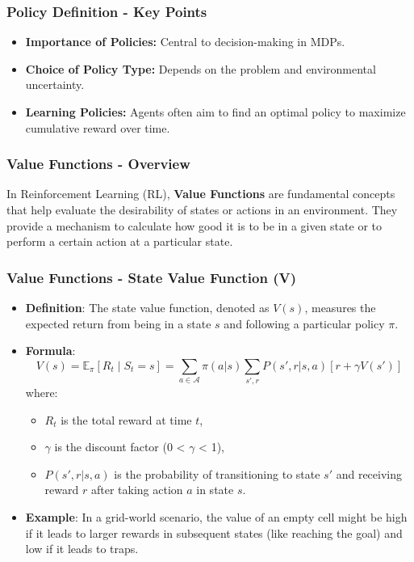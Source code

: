 \documentclass[aspectratio=169]{beamer}
\begin{document}
\begin{frame}[fragile]
    \frametitle{Policy Definition - Key Points}
    \begin{itemize}
        \item \textbf{Importance of Policies:} Central to decision-making in MDPs.
        \item \textbf{Choice of Policy Type:} Depends on the problem and environmental uncertainty.
        \item \textbf{Learning Policies:} Agents often aim to find an optimal policy to maximize cumulative reward over time.
    \end{itemize}
\end{frame}

\begin{frame}[fragile]
    \frametitle{Value Functions - Overview}
    In Reinforcement Learning (RL), \textbf{Value Functions} are fundamental concepts that help evaluate the desirability of states or actions in an environment. They provide a mechanism to calculate how good it is to be in a given state or to perform a certain action at a particular state.
\end{frame}

\begin{frame}[fragile]
    \frametitle{Value Functions - State Value Function (V)}
    \begin{itemize}
        \item \textbf{Definition}: The state value function, denoted as \( V(s) \), measures the expected return from being in a state \( s \) and following a particular policy \( \pi \).
        
        \item \textbf{Formula}:
        \begin{equation}
            V(s) = \mathbb{E}_\pi \left[ R_t \mid S_t = s \right] = \sum_{a \in \mathcal{A}} \pi(a|s) \sum_{s', r} P(s', r | s, a) [r + \gamma V(s')]
        \end{equation}
        where:
        \begin{itemize}
            \item \( R_t \) is the total reward at time \( t \),
            \item \( \gamma \) is the discount factor (0 < \(\gamma\) < 1),
            \item \( P(s', r | s, a) \) is the probability of transitioning to state \( s' \) and receiving reward \( r \) after taking action \( a \) in state \( s \).
        \end{itemize}
        
        \item \textbf{Example}: In a grid-world scenario, the value of an empty cell might be high if it leads to larger rewards in subsequent states (like reaching the goal) and low if it leads to traps.
    \end{itemize}
\end{frame}
\end{document}
